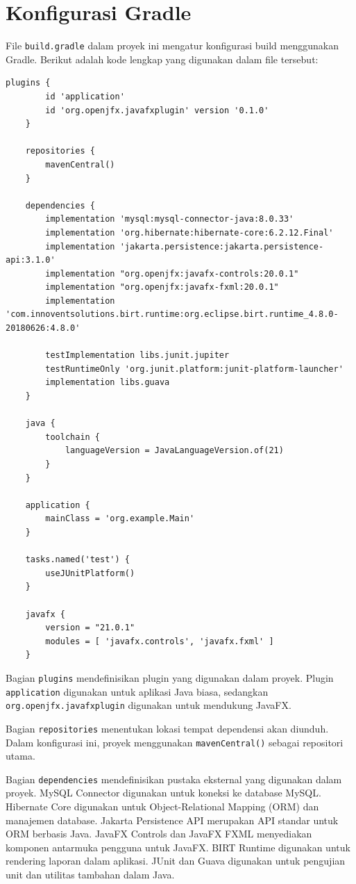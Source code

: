 \section{Konfigurasi Gradle}

File \texttt{build.gradle} dalam proyek ini mengatur konfigurasi build menggunakan Gradle. Berikut adalah kode lengkap yang digunakan dalam file tersebut:

\begin{lstlisting}[style=JavaStyle]
	plugins {
		id 'application'
		id 'org.openjfx.javafxplugin' version '0.1.0'
	}
	
	repositories {
		mavenCentral()
	}
	
	dependencies {
		implementation 'mysql:mysql-connector-java:8.0.33'
		implementation 'org.hibernate:hibernate-core:6.2.12.Final'
		implementation 'jakarta.persistence:jakarta.persistence-api:3.1.0'
		implementation "org.openjfx:javafx-controls:20.0.1"
		implementation "org.openjfx:javafx-fxml:20.0.1"
		implementation 'com.innoventsolutions.birt.runtime:org.eclipse.birt.runtime_4.8.0-20180626:4.8.0'
		
		testImplementation libs.junit.jupiter
		testRuntimeOnly 'org.junit.platform:junit-platform-launcher'
		implementation libs.guava
	}
	
	java {
		toolchain {
			languageVersion = JavaLanguageVersion.of(21)
		}
	}
	
	application {
		mainClass = 'org.example.Main'
	}
	
	tasks.named('test') {
		useJUnitPlatform()
	}
	
	javafx {
		version = "21.0.1"
		modules = [ 'javafx.controls', 'javafx.fxml' ]
	}
\end{lstlisting}

Bagian \texttt{plugins} mendefinisikan plugin yang digunakan dalam proyek. Plugin \texttt{application} digunakan untuk aplikasi Java biasa, sedangkan \texttt{org.openjfx.javafxplugin} digunakan untuk mendukung JavaFX.

Bagian \texttt{repositories} menentukan lokasi tempat dependensi akan diunduh. Dalam konfigurasi ini, proyek menggunakan \texttt{mavenCentral()} sebagai repositori utama.

Bagian \texttt{dependencies} mendefinisikan pustaka eksternal yang digunakan dalam proyek. MySQL Connector digunakan untuk koneksi ke database MySQL. Hibernate Core digunakan untuk Object-Relational Mapping (ORM) dan manajemen database. Jakarta Persistence API merupakan API standar untuk ORM berbasis Java. JavaFX Controls dan JavaFX FXML menyediakan komponen antarmuka pengguna untuk JavaFX. BIRT Runtime digunakan untuk rendering laporan dalam aplikasi. JUnit dan Guava digunakan untuk pengujian unit dan utilitas tambahan dalam Java.

